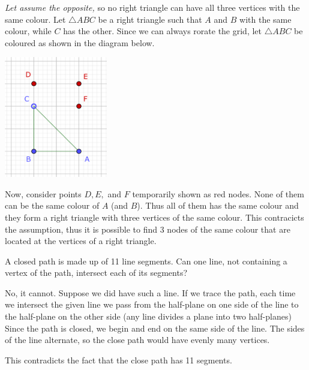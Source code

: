 \documentclass{article}
\begin{document}
\begin{soln}
    \textit{Let assume the opposite,} so no right triangle can have all three vertices with the same colour.
    Let $\triangle ABC$ be a right triangle such that $A$ and $B$ with the same colour, while $C$ has the other.
    Since we can always rorate the grid, let $\triangle ABC$ be coloured as shown in the diagram below.

    \begin{center}
        \includegraphics[width=4.5cm]{./svg/pdf/sc-23-ms-2-e4.pdf}
    \end{center}
    
    Now, consider points $D, E,$ and $F$ temporarily shown as red nodes.
    None of them can be the same colour of $A$ (and $B$).
    Thus all of them has the same colour and they form a right triangle with three vertices of the same colour.
    This contracicts the assumption, thus it is possible to find 3 nodes of the same colour
    that are located at the vertices of a right triangle.
\end{soln}

\begin{example*}[Example 5]
    A closed path is made up of 11 line segments. Can one line, not containing a vertex of the path, intersect each of its segments?
\end{example*}

\begin{soln}
    No, it cannot. Suppose we did have such a line.
    If we trace the path, each time we intersect the given line
    we pass from the half-plane on one side of the line to the half-plane on the other side
    (any line divides a plane into two half-planes)
    Since the path is closed, we begin and end on the same side of the line.
    The sides of the line alternate, so the close path would have evenly many vertices.

    This contradicts the fact that the close path has 11 segments.
\end{soln}
    
\end{document}
